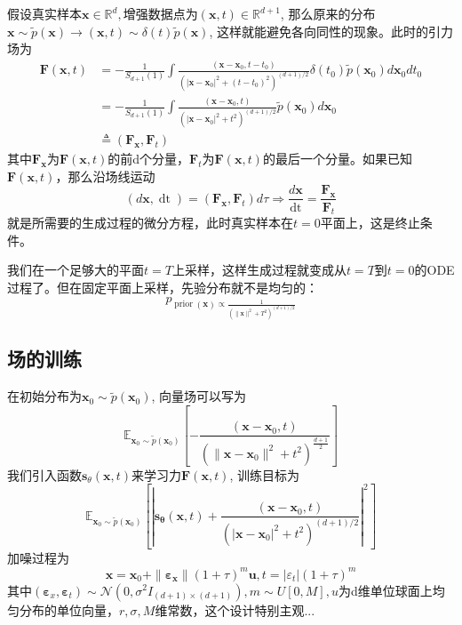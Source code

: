 \documentclass{article}
\newcommand{\textdots}{...}
\newcommand{\tmmathbf}[1]{\ensuremath{\boldsymbol{#1}}}
\newcommand{\tmop}[1]{\ensuremath{\operatorname{#1}}}
\begin{document}
\begin{CJK*}{UTF8}{gbsn}
假设真实样本$\tmmathbf{x} \in
\mathbb{R}^d,$增强数据点为$(\tmmathbf{x}, t) \in \mathbb{R}^{d + 1}$,
那么原来的分布$\tmmathbf{x} \sim \tilde{p} (\tmmathbf{x}) \rightarrow
(\tmmathbf{x}, t) \sim \delta (t) \tilde{p} (\tmmathbf{x})$,
这样就能避免各向同性的现象。此时的引力场为
\[ \begin{aligned}
     \tmmathbf{F} (\tmmathbf{x}, t) & = - \frac{1}{S_{d + 1} (1)} \int
     \frac{(\tmmathbf{x}-\tmmathbf{x}_0, t - t_0)}{(|
     \tmmathbf{x}-\tmmathbf{x}_0 |^2 + (t - t_0)^2)^{(d + 1) / 2}} \delta
     (t_0) \tilde{p} (\tmmathbf{x}_0) d\tmmathbf{x}_0 dt_0\\
     & = - \frac{1}{S_{d + 1} (1)}  \int \frac{(\tmmathbf{x}-\tmmathbf{x}_0,
     t)}{(| \tmmathbf{x}-\tmmathbf{x}_0 |^2 + t^2)^{(d + 1) / 2}}  \tilde{p}
     (\tmmathbf{x}_0) d\tmmathbf{x}_0\\
     & \triangleq (\tmmathbf{F}_{\tmmathbf{x}}, \tmmathbf{F}_t)
   \end{aligned} \]
其中$\tmmathbf{F}_{\tmmathbf{x}}$为$\tmmathbf{F} (\tmmathbf{x},
t)$的前d个分量，$\tmmathbf{F}_t$为$\tmmathbf{F} (\tmmathbf{x},
t)$的最后一个分量。如果已知$\tmmathbf{F} (\tmmathbf{x},
t)$，那么沿场线运动
\[ (d\tmmathbf{x}, \tmop{dt}) = (\tmmathbf{F}_{\tmmathbf{x}}, \tmmathbf{F}_t)
   d \tau \Rightarrow \frac{d\tmmathbf{x}}{\tmop{dt}} =
   \frac{\tmmathbf{F}_{\tmmathbf{x}}}{\tmmathbf{F}_t} \]
就是所需要的生成过程的微分方程，此时真实样本在$t =
0$平面上，这是终止条件。

我们在一个足够大的平面$t =
T$上采样，这样生成过程就变成从$t = T$到$t =
0$的ODE过程了。但在固定平面上采样，先验分布就不是均匀的：
\[ p_{\tmop{prior} (\tmmathbf{x}) \propto \frac{1}{(\| \tmmathbf{x} \|^2 +
   T^2)^{(d + 1) / 2}}} \]



\subsection{场的训练}

在初始分布为$\tmmathbf{x}_0 \sim \tilde{p} (\tmmathbf{x}_0)$,
向量场可以写为
\[ \mathbb{E}_{\tmmathbf{x}_0 \sim \tilde{p} (\tmmathbf{x}_0)} \left[ -
   \frac{(\tmmathbf{x}-\tmmathbf{x}_0, t)}{(\| \tmmathbf{x}-\tmmathbf{x}_0
   \|^2 + t^2)^{\frac{d + 1}{2}}} \right] \]
我们引入函数$\tmmathbf{s}_{\theta} (\tmmathbf{x},
t)$来学习力$\tmmathbf{F} (\tmmathbf{x}, t)$, 训练目标为
\[ \mathbb{E}_{\tmmathbf{x}_0 \sim \tilde{p} (\tmmathbf{x}_0)} \left[ \left|
   \tmmathbf{s}_{\tmmathbf{\theta}} (\tmmathbf{x}, t) +
   \frac{(\tmmathbf{x}-\tmmathbf{x}_0, t)}{(| \tmmathbf{x}-\tmmathbf{x}_0 |^2
   + t^2)^{(d + 1) / 2}} \right|^2 \right] \]
加噪过程为
\[ \tmmathbf{x}=\tmmathbf{x}_0 + \| \tmmathbf{\varepsilon}_{\tmmathbf{x}} \|
   (1 + \tau)^m \tmmathbf{u}, t = | \varepsilon_t | (1 + \tau)^m \]
其中$(\tmmathbf{\varepsilon}_x, \tmmathbf{\varepsilon}_t) \sim \mathcal{N}
(0, \sigma^2 I_{(d + 1) \times (d + 1)}), m \sim U [0, M],
u$为d维单位球面上均匀分布的单位向量，$r, \sigma,
M$维常数，这个设计特别主观{\textdots}


\end{CJK*}
\end{document}
